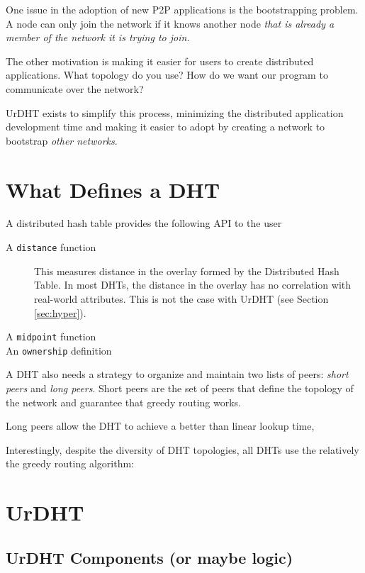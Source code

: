 \documentclass[11pt,conference]{IEEEtran}
\begin{document}
One issue in the adoption of new P2P applications is the bootstrapping problem.
A node can only join the network if it knows another node \textit{that is already a member of the network it is trying to join.}


The other motivation is making it easier for users to create distributed applications.
What topology do you use?
How do we want our program to communicate over the network?


UrDHT exists to simplify this process, minimizing the distributed application development time and making it easier to adopt by creating a network to bootstrap \textit{other networks}.

\section{What Defines a DHT}
\label{sec:define}

A distributed hash table provides the following API to the user


\begin{description}
	\item [A \texttt{distance} function] \qquad
	This measures distance in the overlay formed by the Distributed Hash Table.
	In most DHTs, the distance in the overlay has no correlation with real-world attributes.
	This is not the case with UrDHT (see Section \ref{sec:hyper}).
	
	\item [A \texttt{midpoint} function]  %
	\item [An \texttt{ownership} definition]
\end{description}


A DHT also needs a strategy to organize and maintain two lists of peers: \textit{short peers} and \textit{long peers}.
Short peers are the set of peers that define the topology of the network and guarantee that greedy routing works.

Long peers allow the DHT to achieve a better than linear lookup time, 

Interestingly, despite the diversity of DHT topologies, all DHTs use the relatively the greedy routing algorithm:

\section{UrDHT}
\label{sec:urdht}
	\subsection{UrDHT Components (or maybe logic)}
	
\end{document}

